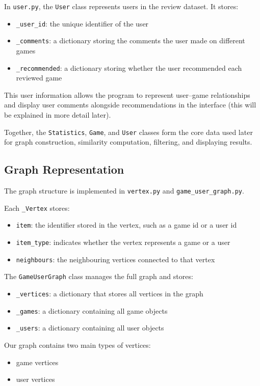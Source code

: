 \documentclass[fontsize=11pt]{article}
\begin{document}
In \texttt{user.py}, the \texttt{User} class represents users in the review dataset. It stores:
\begin{itemize}
    \item \texttt{\_user\_id}: the unique identifier of the user
    \item \texttt{\_comments}: a dictionary storing the comments the user made on different games
    \item \texttt{\_recommended}: a dictionary storing whether the user recommended each reviewed game
\end{itemize}

This user information allows the program to represent user--game relationships and display user comments alongside recommendations in the interface (this will be explained in more detail later).

Together, the \texttt{Statistics}, \texttt{Game}, and \texttt{User} classes form the core data used later for graph construction, similarity computation, filtering, and displaying results.

\subsection{Graph Representation}

The graph structure is implemented in \texttt{vertex.py} and \texttt{game\_user\_graph.py}.

Each \texttt{\_Vertex} stores:
\begin{itemize}
    \item \texttt{item}: the identifier stored in the vertex, such as a game id or a user id
    \item \texttt{item\_type}: indicates whether the vertex represents a game or a user
    \item \texttt{neighbours}: the neighbouring vertices connected to that vertex
\end{itemize}

The \texttt{GameUserGraph} class manages the full graph and stores:
\begin{itemize}
    \item \texttt{\_vertices}: a dictionary that stores all vertices in the graph
    \item \texttt{\_games}: a dictionary containing all game objects
    \item \texttt{\_users}: a dictionary containing all user objects
\end{itemize}

Our graph contains two main types of vertices:
\begin{itemize}
    \item game vertices
    \item user vertices
\end{itemize}
\end{document}
